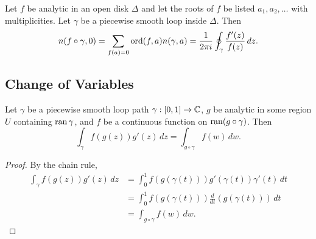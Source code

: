\begin{theorem}
    Let $f$ be analytic in an open disk $\Delta$ and let 
    the roots of $f$ be listed $a_1, a_2, \ldots$ with
    multiplicities.
    Let $\gamma$ be a piecewise smooth loop inside $\Delta$.
    Then
    \[
        n(f \circ \gamma, 0)
        = \sum_{f(a) = 0} \operatorname{ord} (f, a) n(\gamma, a)
        = \frac{1}{2\pi i} \oint_{\gamma} \frac{f'(z)}{f(z)} \,
        dz.
    \]
\end{theorem}

\subsection{Change of Variables}

\begin{theorem}
    Let $\gamma$ be a piecewise smooth loop path $\gamma: [0,1]
    \to \operatorname{\mathbb{C}}$, $g$ be analytic in some region $U$ containing
    $\operatorname{ran} \gamma$, and
    $f$ be a continuous function on $\operatorname{ran} (g \circ \gamma)$.
    Then
    \[
        \int_{\gamma} f(g(z)) g'(z) \, dz = 
        \int_{g \circ \gamma} f(w) \, dw.
    \]
\end{theorem}

\begin{proof}
    By the chain rule,
    \begin{align*}
        \int_{\gamma} f(g(z)) g'(z) \, dz &= 
        \int_0^1 f(g(\gamma(t))) g'(\gamma(t)) \gamma'(t) \, dt\\
        &= \int_0^1 f(g(\gamma(t))) \frac{d}{dt} (g(\gamma(t)))
        \, dt \\
        &= \int_{g \circ \gamma} f(w) \, dw.
    \end{align*}
\end{proof}


